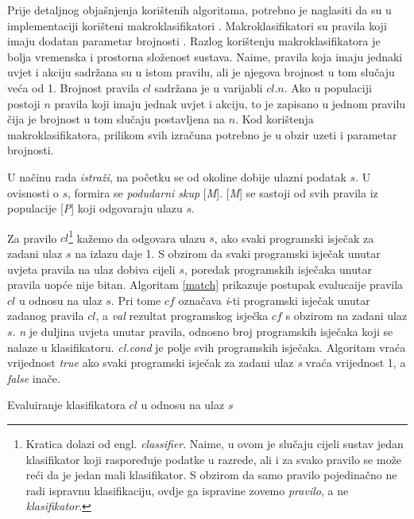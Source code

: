 \documentclass[times, utf8, zavrsni]{fer}
\begin{document}
Prije detaljnog objašnjenja korištenih algoritama, potrebno je naglasiti da su u implementaciji korišteni makroklasifikatori  \citep{2}.
Makroklasifikatori su pravila koji imaju dodatan parametar brojnosti .
Razlog korištenju makroklasifikatora je bolja vremenska i prostorna složenost sustava.
Naime, pravila koja imaju jednaki uvjet i akciju sadržana su u istom pravilu, ali je njegova brojnost u tom slučaju veća od 1.
Brojnost pravila $cl$ sadržana je u varijabli $cl.n$.
Ako u populaciji postoji $n$ pravila koji imaju jednak uvjet i akciju, to je zapisano u jednom pravilu čija je brojnost u tom slučaju postavljena na $n$.
Kod korištenja makroklasifikatora, prilikom svih izračuna potrebno je u obzir uzeti i parametar brojnosti.

U načinu rada \emph{istraži}, na početku se od okoline dobije ulazni podatak $s$.
U ovisnosti o $s$, formira se \emph{podudarni skup} [\emph{M}].
[\emph{M}] se sastoji od svih pravila iz populacije [\emph{P}] koji odgovaraju ulazu $s$.

Za pravilo $cl$\footnote{Kratica dolazi od engl. \emph{classifier}. Naime, u ovom je slučaju cijeli sustav jedan klasifikator koji raspoređuje podatke u razrede, ali i za svako pravilo se može reći da je jedan mali klasifikator. S obzirom da samo pravilo pojedinačno ne radi ispravnu klasifikaciju, ovdje ga ispravine zovemo \emph{pravilo}, a ne \emph{klasifikator}.} kažemo da odgovara ulazu $s$, ako svaki programski isječak za zadani ulaz $s$ na izlazu daje 1.
S obzirom da svaki programski isječak unutar uvjeta pravila na ulaz dobiva cijeli $s$, poredak programskih isječaka unutar pravila uopće nije bitan.
Algoritam \ref{match} prikazuje postupak evalucaije pravila $cl$ u odnosu na ulaz $s$.
Pri tome $cf$ označava \emph{i}-ti programski isječak unutar zadanog pravila $cl$, a \emph{val} rezultat programskog isječka $cf$ s obzirom na zadani ulaz $s$.
\emph{n} je duljina uvjeta unutar pravila, odnosno broj programskih isječaka koji se nalaze u klasifikatoru.
\emph{cl.cond} je polje svih programskih isječaka.
Algoritam vraća vrijednost \emph{true} ako svaki programski isječak za zadani ulaz \emph{s} vraća vrijednost 1, a \emph{false} inače.

\begin{algorithm}
    \caption{Evaluiranje klasifikatora $cl$ u odnosu na ulaz $s$}
    \label{match}
    \begin{algorithmic}
        \ENDIF
        \ENDFOR
    \end{algorithmic}
\end{algorithm}
\end{document}
